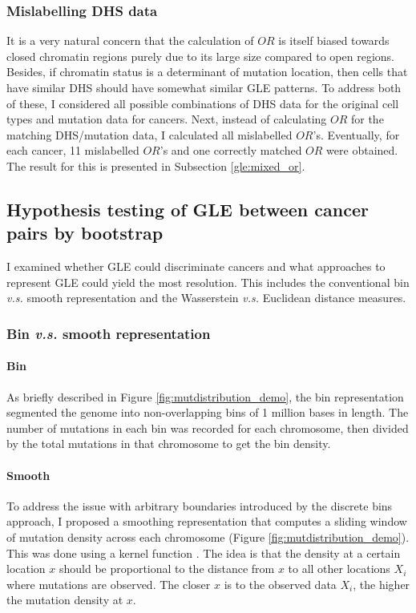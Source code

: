 \subsubsection{Mislabelling DHS data}
It is a very natural concern that the calculation of $OR$ is itself biased towards closed chromatin regions purely due to its large size compared to open regions. Besides, if chromatin status is a determinant of mutation location, then cells that have similar DHS should have somewhat similar GLE patterns. To address both of these, I considered all possible combinations of DHS data for the original cell types and mutation data for cancers. Next, instead of calculating $OR$ for the matching DHS/mutation data, I calculated all mislabelled $OR$'s. Eventually, for each cancer, 11 mislabelled $OR$'s and one correctly matched $OR$ were obtained. The result for this is presented in Subsection \ref{gle:mixed_or}.

\subsection{Hypothesis testing of GLE between cancer pairs by bootstrap}\label{methods:bootstrap}

I examined whether GLE could discriminate cancers and what approaches to represent GLE could yield the most resolution. This includes the conventional bin \textit{v.s.} smooth representation and the Wasserstein \textit{v.s.} Euclidean distance measures. 

\subsubsection{Bin \textit{v.s.} smooth representation}
\paragraph{Bin} As briefly described in Figure \ref{fig:mutdistribution_demo}, the bin representation segmented the genome into non-overlapping bins of 1 million bases in length. The number of mutations in each bin was recorded for each chromosome, then divided by the total mutations in that chromosome to get the bin density. 
\paragraph{Smooth} To address the issue with arbitrary boundaries introduced by the discrete bins approach, I proposed a smoothing representation that computes a sliding window of mutation density across each chromosome (Figure \ref{fig:mutdistribution_demo}). This was done using a kernel function \citep[equation \ref{eq:density};][]{Silverman1986DensityAnalysis}. The idea is that the density at a certain location $x$ should be proportional to the distance from $x$ to all other locations $X_i$ where mutations are observed. The closer $x$ is to the observed data $X_i$, the higher the mutation density at $x$.

